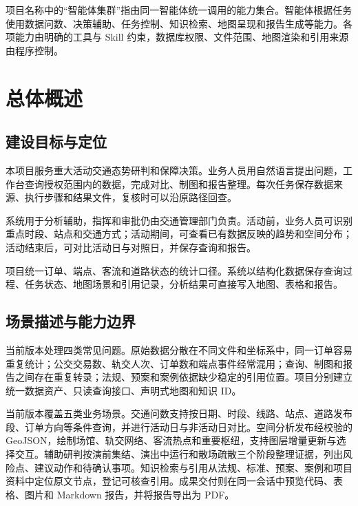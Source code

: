 \documentclass[a4paper,11pt]{article}
\begin{document}
项目名称中的``智能体集群''指由同一智能体统一调用的能力集合。智能体根据任务使用数据问数、决策辅助、任务控制、知识检索、地图呈现和报告生成等能力。各项能力由明确的工具与 Skill 约束，数据库权限、文件范围、地图渲染和引用来源由程序控制。

\newpage
\tableofcontents

\newpage
\section{总体概述}

\subsection{建设目标与定位}

本项目服务重大活动交通态势研判和保障决策。业务人员用自然语言提出问题，工作台查询授权范围内的数据，完成对比、制图和报告整理。每次任务保存数据来源、执行步骤和结果文件，复核时可以沿原路径回查。

系统用于分析辅助，指挥和审批仍由交通管理部门负责。活动前，业务人员可识别重点时段、站点和交通方式；活动期间，可查看已有数据反映的趋势和空间分布；活动结束后，可对比活动日与对照日，并保存查询和报告。

项目统一订单、端点、客流和道路状态的统计口径。系统以结构化数据保存查询过程、任务状态、地图场景和引用记录，分析结果可直接写入地图、表格和报告。

\subsection{场景描述与能力边界}

当前版本处理四类常见问题。原始数据分散在不同文件和坐标系中，同一订单容易重复统计；公交交易数、轨交人次、订单数和端点事件经常混用；查询、制图和报告之间存在重复转录；法规、预案和案例依据缺少稳定的引用位置。项目分别建立统一数据资产、只读查询接口、声明式地图和知识 ID。

当前版本覆盖五类业务场景。交通问数支持按日期、时段、线路、站点、道路发布段、订单方向等条件查询，并进行活动日与非活动日对比。空间分析发布经校验的 GeoJSON，绘制场馆、轨交网络、客流热点和重要枢纽，支持图层增量更新与选择交互。辅助研判按演前集结、演出中运行和散场疏散三个阶段整理证据，列出风险点、建议动作和待确认事项。知识检索与引用从法规、标准、预案、案例和项目资料中定位原文节点，登记可核查引用。成果交付则在同一会话中预览代码、表格、图片和 Markdown 报告，并将报告导出为 PDF。
\end{document}

